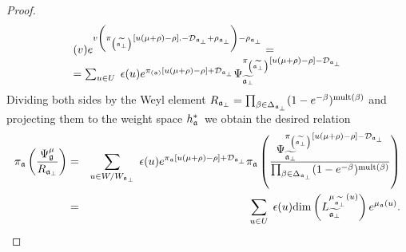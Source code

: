 \documentclass[12pt]{iopart}
\theoremstyle{definition}
\theoremstyle{definition}
\theoremstyle{definition}
\theoremstyle{definition}
\begin{document}
\begin{proof}
\begin{equation*}
\begin{array}{l}
(v)e^{v\left( \pi _{\left( \widetilde{\frak{a}_{\perp }}\right) }\left[
u(\mu +\rho )-\rho \right] .-\mathcal{D}_{\frak{a}_{\perp }}+\rho _{\frak{a}%
_{\perp }}\right) -\rho _{\frak{a}_{\perp }}}= \\
=\sum_{u\in U}\;\epsilon (u)e^{\pi _{\left( \frak{a}\right) }\left[ u(\mu
+\rho )-\rho \right] +\mathcal{D}_{\frak{a}_{\perp }}}\Psi _{\widetilde{%
\frak{a}_{\perp }}}^{\pi _{\left( \widetilde{\frak{a}_{\perp }}\right) }%
\left[ u(\mu +\rho )-\rho \right] -\mathcal{D}_{\frak{a}_{\perp }}}
\end{array}
\end{equation*}
Dividing both sides by the Weyl element $R_{\frak{a}_{\perp }}=\prod_{\beta
\in \Delta _{\frak{a}_{\perp }}}(1-e^{-\beta })^{\mathrm{mult}(\beta )}$ and
projecting them to the weight space $h_{\frak{a}}^{\ast }$\ we obtain the
desired relation
\begin{eqnarray*}
\pi _{\frak{a}}\left( \frac{\Psi _{\frak{g}}^{\mu }}{R_{\frak{a}_{\perp }}}%
\right)  &=&\sum_{u\in W/W_{\frak{a}_{\perp }}}\;\epsilon (u)e^{\pi _{\frak{a%
}}\left[ u(\mu +\rho )-\rho \right] +\mathcal{D}_{\frak{a}_{\perp }}}\pi _{%
\frak{a}}\left( \frac{\Psi _{\widetilde{\frak{a}_{\perp }}}^{\pi _{\left(
\widetilde{\frak{a}_{\perp }}\right) }\left[ u(\mu +\rho )-\rho \right] -%
\mathcal{D}_{\frak{a}_{\perp }}}}{\prod_{\beta \in \Delta _{\frak{a}_{\perp
}}}(1-e^{-\beta })^{\mathrm{mult}(\beta )}}\right)  \\
&=&\sum_{u\in U}\;\epsilon (u)\mathrm{\dim }\left( L_{\widetilde{\frak{a}%
_{\perp }}}^{\mu _{\widetilde{\frak{a}_{\perp }}}\left( u\right) }\right)
e^{\mu _{\frak{a}}\left( u\right) }.
\end{eqnarray*}
\end{proof}
\end{document}
